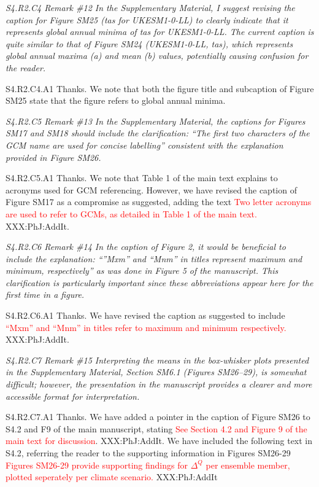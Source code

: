 \documentclass[a4paper,10pt]{article}
\newcommand{\ed}[1]{\textcolor{red}{#1}}
\begin{document}
	\emph{S4.R2.C4 Remark \#12 In the Supplementary Material, I suggest revising the caption for Figure SM25 (tas for UKESM1-0-LL) to clearly indicate that it represents global annual minima of tas for UKESM1-0-LL. The current caption is quite similar to that of Figure SM24 (UKESM1-0-LL, tas), which represents global annual maxima (a) and mean (b) values, potentially causing confusion for the reader.}

	S4.R2.C4.A1 Thanks. We note that both the figure title and subcaption of Figure SM25 state that the figure refers to global annual minima.

	\emph{S4.R2.C5 Remark \#13 In the Supplementary Material, the captions for Figures SM17 and SM18 should include the clarification: “The first two characters of the GCM name are used for concise labelling” consistent with the explanation provided in Figure SM26.}

	S4.R2.C5.A1 Thanks. We note that Table 1 of the main text explains to acronyms used for GCM referencing. However, we have revised the caption of Figure SM17 as a compromise as suggested, adding the text \ed{Two letter acronyms are used to refer to GCMs, as detailed in Table 1 of the main text.} XXX:PhJ:AddIt.

	\emph{S4.R2.C6 Remark \#14 In the caption of Figure 2, it would be beneficial to include the explanation: “”Mxm” and “Mnm” in titles represent maximum and minimum, respectively” as was done in Figure 5 of the manuscript. This clarification is particularly important since these abbreviations appear here for the first time in a figure.}

	S4.R2.C6.A1 Thanks. We have revised the caption as suggested to include \ed{``Mxm'' and ``Mnm'' in titles refer to maximum and minimum respectively.} XXX:PhJ:AddIt.

	\emph{S4.R2.C7 Remark \#15 Interpreting the means in the box-whisker plots presented in the Supplementary Material, Section SM6.1 (Figures SM26–29), is somewhat difficult; however, the presentation in the manuscript provides a clearer and more accessible format for interpretation.}

	S4.R2.C7.A1 Thanks. We have added a pointer in the caption of Figure SM26 to S4.2 and F9 of the main manuscript, stating \ed{See Section 4.2 and Figure 9 of the main text for discussion}. XXX:PhJ:AddIt. We have included the following text in S4.2, referring the reader to the supporting information in Figures SM26-29 \ed{Figures SM26-29 provide supporting findings for $\Delta^Q$ per ensemble member, plotted seperately per climate scenario.} XXX:PhJ:AddIt
\end{document}
